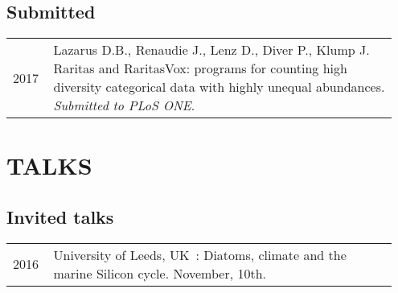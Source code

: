 \documentclass[11pt, a4paper]{article}
\begin{document}
\subsection{Submitted}
\begin{longtable}{p{0.1\linewidth} P{0.85\linewidth}}
2017 & Lazarus D.B., Renaudie J., Lenz D., Diver P., Klump J. Raritas and RaritasVox: programs for counting high diversity categorical data with highly unequal abundances. \emph{Submitted to PLoS ONE}.\\
\end{longtable}

\section{TALKS}
\subsection{Invited talks}
\begin{longtable}{p{0.1\linewidth} P{0.85\linewidth}}
2016 & University of Leeds, UK : Diatoms, climate and the marine Silicon cycle. November, 10th.\\
\end{longtable}
\end{document}
